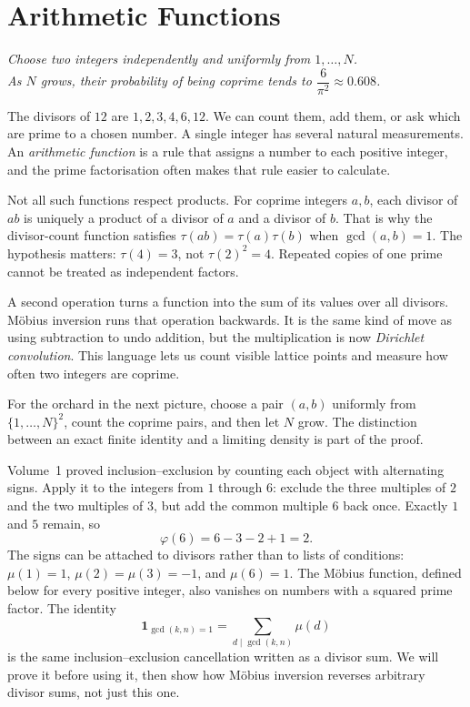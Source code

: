 \chapter{Arithmetic Functions}\label{ch:functions}

\begin{center}\itshape
Choose two integers independently and uniformly from $1,\ldots,N$.\\
As $N$ grows, their probability of being coprime tends to $\dfrac6{\pi^2}\approx0.608$.
\end{center}

The divisors of $12$ are $1,2,3,4,6,12$. We can count them, add them, or ask which are prime to a chosen number. A single integer has several natural measurements. An \emph{arithmetic function} is a rule that assigns a number to each positive integer, and the prime factorisation often makes that rule easier to calculate.

Not all such functions respect products. For coprime integers $a,b$, each divisor of $ab$ is uniquely a product of a divisor of $a$ and a divisor of $b$. That is why the divisor-count function satisfies $\tau(ab)=\tau(a)\tau(b)$ when $\gcd(a,b)=1$. The hypothesis matters: $\tau(4)=3$, not $\tau(2)^2=4$. Repeated copies of one prime cannot be treated as independent factors.

A second operation turns a function into the sum of its values over all divisors. Möbius inversion runs that operation backwards. It is the same kind of move as using subtraction to undo addition, but the multiplication is now \emph{Dirichlet convolution}. This language lets us count visible lattice points and measure how often two integers are coprime.

For the orchard in the next picture, choose a pair $(a,b)$ uniformly from $\{1,\ldots,N\}^2$, count the coprime pairs, and then let $N$ grow. The distinction between an exact finite identity and a limiting density is part of the proof.

\begin{reminder}
Volume~1 proved inclusion--exclusion by counting each object with alternating signs. Apply it to the integers from $1$ through $6$: exclude the three multiples of $2$ and the two multiples of $3$, but add the common multiple $6$ back once. Exactly $1$ and $5$ remain, so
\[
\varphi(6)=6-3-2+1=2.
\]
The signs can be attached to divisors rather than to lists of conditions:
$\mu(1)=1$, $\mu(2)=\mu(3)=-1$, and $\mu(6)=1$.
The M\"obius function, defined below for every positive integer, also
vanishes on numbers with a squared prime factor. The identity
\[
\mathbf 1_{\gcd(k,n)=1}=\sum_{d\mid\gcd(k,n)}\mu(d)
\]
is the same inclusion--exclusion cancellation written as a divisor sum.
We will prove it before using it, then show how M\"obius inversion reverses
arbitrary divisor sums, not just this one.
\end{reminder}

